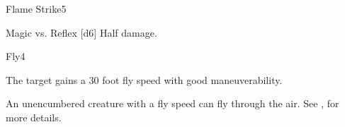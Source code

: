 \begin{spellsection}{Flame Strike}{5}
\begin{spellheader}
\end{spellheader}
\begin{spellcontent}
    \begin{spelltargetinginfo}
    \end{spelltargetinginfo}
    \begin{spelleffects}
        \begin{spellattack}{Magic vs. Reflex}
            \spellsuccess {}[d6]
            \spellfailure Half damage.
        \end{spellattack}
    \end{spelleffects}
\end{spellcontent}
\begin{spellfooter}
    \spellnotes \destructivespellnotes

    \firespellnotes
\end{spellfooter}
\end{spellsection}

\begin{spellsection}{Fly}{4}
\begin{spellheader}
\end{spellheader}
\begin{spellcontent}
    \begin{spelltargetinginfo}
    \end{spelltargetinginfo}
    \begin{spelleffects}
        \spelleffect The target gains a 30 foot fly speed with good maneuverability.
        \spelldur \durshort
    \end{spelleffects}
\end{spellcontent}
\begin{spellfooter}
    \spellnotes An unencumbered creature with a fly speed can fly through the air. See , for more details.
\end{spellfooter}%
\end{spellsection}

